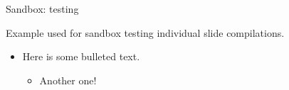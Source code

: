 \begin{frame}[fragile]{Sandbox: testing}

Example used for sandbox testing individual slide compilations.

\begin{itemize}
    \item Here is some bulleted text.
    \begin{itemize}
        \item Another one!
    \end{itemize}
\end{itemize}

\end{frame}